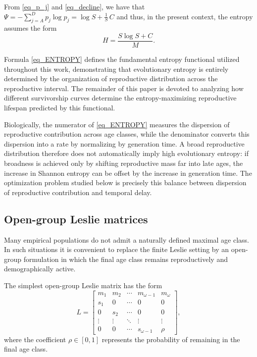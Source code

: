 \documentclass[10pt,a4paper]{amsart}
\theoremstyle{definition}
\theoremstyle{remark}
\numberwithin{equation}{section}
\begin{document}
From \eqref{eq_p_j} and \eqref{eq_decline}, we have that
$
\Psi = -\sum_{j=A}^{D}
p_j\log p_j
=
\log S
+
\frac1S\,C
$ and thus, in the present context, the entropy assumes the form
\begin{equation}
\label{eq_ENTROPY}
H
=
\frac{
S\log S
+
C
}{
M
}.
\end{equation}

Formula \eqref{eq_ENTROPY} defines the fundamental entropy functional utilized throughout this work, demonstrating that evolutionary entropy is entirely determined by the organization of reproductive distribution across the reproductive interval. The remainder of this paper is devoted to analyzing how different survivorship curves determine the entropy-maximizing reproductive lifespan predicted by this functional.

Biologically, the numerator of \eqref{eq_ENTROPY} measures the dispersion of reproductive contribution across age classes, while the denominator converts this dispersion into a rate by normalizing by generation time. A broad reproductive distribution therefore does not automatically imply high evolutionary entropy: if broadness is achieved only by shifting reproductive mass far into late ages, the increase in Shannon entropy can be offset by the increase in generation time. The optimization problem studied below is precisely this balance between dispersion of reproductive contribution and temporal delay.


\subsection{Open-group Leslie matrices}
\label{sec_open_group}

Many empirical populations do not admit a naturally defined maximal
age class.
In such situations it is convenient to replace the finite Leslie
setting by an open-group formulation in which the final age class
remains reproductively and demographically active.

The simplest open-group Leslie matrix has the form
\[
L=
\begin{bmatrix}
m_1 & m_2 & \cdots & m_{\omega-1} & m_\omega\\
s_1 & 0 & \cdots & 0 & 0\\
0 & s_2 & \cdots & 0 & 0\\
\vdots & \vdots & \ddots & \vdots & \vdots\\
0 & 0 & \cdots & s_{\omega-1} & \rho
\end{bmatrix},
\]
where the coefficient
$
\rho\in[0,1]
$
represents the probability of remaining in the final age class.
\end{document}
